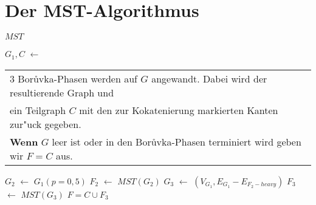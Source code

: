 \section{Der MST-Algorithmus}
\begin{algorithm}
$MST$\\
\begin{algorithmic}[1]
    \STATE $G_1, C$ $\leftarrow$\begin{tabular}[H]{l}
                                 3 Bor\r uvka-Phasen werden auf $G$ angewandt.
                                 Dabei wird der resultierende Graph und\\
                                 ein Teilgraph $C$ mit den zur
                                 Kokatenierung markierten Kanten zur"uck gegeben.\\
                                 \textbf{Wenn} $G$ leer ist oder in den Bor\r uvka-Phasen
                                 terminiert wird geben wir $F=C$ aus.\\
                                 \end{tabular}
    \STATE $G_2$ $\leftarrow$ $G_1(p=0,5)$
    \STATE $F_2$ $\leftarrow$ $MST(G_2)$
    \STATE $G_3$ $\leftarrow$ $(V_{G_1}, E_{G_1} - E_{F_2-heavy})$
    \STATE $F_3$ $\leftarrow$ $MST(G_3)$
    \RETURN $F = C \cup F_3$
\end{algorithmic}
\end{algorithm}

